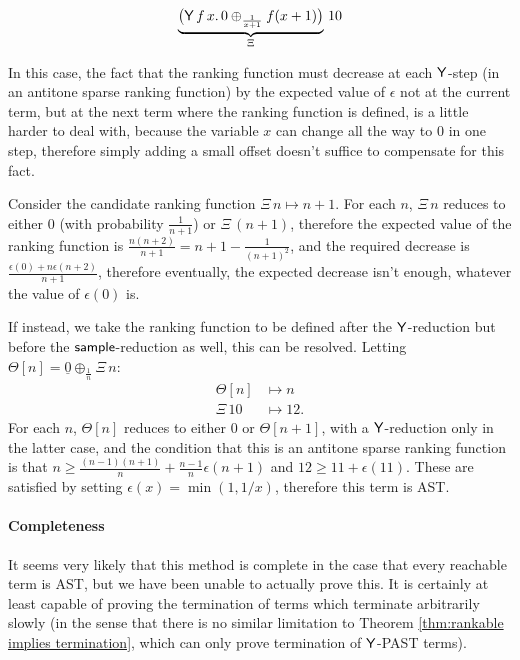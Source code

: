 \begin{example}
\label{ex:escaping spline}\citep[\S 5.4]{DBLP:journals/pacmpl/McIverMKK18}
\[
\underbrace{\big
(\mathsf{Y} \, f \, x . \,
0 \oplus_{\frac{1}{x+1}} f(x + 1) \big)}_{\Xi} 
\, 10
\]

In this case, the fact that the ranking function must decrease at each $\mathsf{Y}$-step (in an antitone sparse ranking function) by the expected value of $\epsilon$ not at the current term, but at the next term where the ranking function is defined, is a little harder to deal with, because the variable $x$ can change all the way to $0$ in one step, therefore simply adding a small offset doesn't suffice to compensate for this fact.

Consider the candidate ranking function $\Xi \, n \mapsto n + 1$. For each $n$, $\Xi \, n$ reduces to either $0$ (with probability $\frac 1 {n + 1}$) or $\Xi \, (n + 1)$, therefore the expected value of the ranking function is $\frac{n(n+2)}{n+1} = n + 1 - \frac 1 {(n+1)^2}$, and the required decrease is $\frac{\epsilon(0) + n \epsilon(n + 2)}{n + 1}$, therefore eventually, the expected decrease isn't enough, whatever the value of $\epsilon(0)$ is.

If instead, we take the ranking function to be defined after the $\mathsf{Y}$-reduction but before the $\mathsf{sample}$-reduction as well, this can be resolved. Letting $\Theta[n] = \underline 0 \oplus_{\frac 1 n} \Xi \, n$:
\begin{align*}
\Theta[n] &\mapsto n \\
\Xi \, 10 & \mapsto 12.
\end{align*}
For each $n$, $\Theta[n]$ reduces to either $0$ or $\Theta[n+1]$, with a $\mathsf{Y}$-reduction only in the latter case, and the condition that this is an antitone sparse ranking function is that $n \geq \frac{(n-1)(n+1)}{n} + \frac{n-1}{n} \epsilon(n+1)$ and $12 \geq 11 + \epsilon(11)$. These are satisfied by setting $\epsilon(x) = \min(1, 1/x)$, therefore this term is AST.
\end{example}

\paragraph*{Completeness}
It seems very likely that this method is complete in the case that every reachable term is AST, but we have been unable to actually prove this. It is certainly at least capable of proving the termination of terms which terminate arbitrarily slowly (in the sense that there is no similar limitation to Theorem \ref{thm:rankable implies termination}, which can only prove termination of $\mathsf{Y}$-PAST terms).

